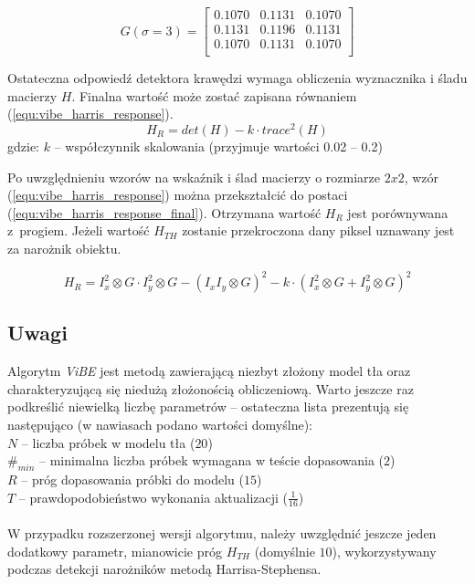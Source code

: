     \begin{equation}
       G(\sigma=3) = \begin{bmatrix}
			   0.1070 & 0.1131 & 0.1070 \\
			   0.1131 & 0.1196 & 0.1131 \\
			   0.1070 & 0.1131 & 0.1070 \\
		    \end{bmatrix}
        \label{equ:vibe_gauss}
    \end{equation}


Ostateczna odpowiedź detektora krawędzi wymaga obliczenia wyznacznika i śladu macierzy $H$. 
Finalna wartość może zostać zapisana równaniem (\ref{equ:vibe_harris_response}).
    \begin{equation}
        H_R = det(H)-k \cdot trace^2(H)
        \label{equ:vibe_harris_response}
    \end{equation}
gdzie: $k$ -- współczynnik skalowania (przyjmuje wartości \num{0.02} -- \num{0.2})


Po uwzględnieniu wzorów na wskaźnik i ślad macierzy o rozmiarze $2x2$, wzór (\ref{equ:vibe_harris_response}) można przekształcić do postaci (\ref{equ:vibe_harris_response_final}). 
Otrzymana wartość $H_R$ jest porównywana z~progiem. 
Jeżeli wartość $H_{TH}$ zostanie przekroczona dany piksel uznawany jest za narożnik obiektu.  

    \begin{equation}
        H_R = I_x^2 \otimes G \cdot I_y^2 \otimes G - (I_x I_y \otimes G)^2  - k \cdot (I_x^2 \otimes G + I_y^2 \otimes G)^2
        \label{equ:vibe_harris_response_final}
    \end{equation}

\subsection{Uwagi}
\label{subsec:vibe_uwagi}

Algorytm \textit{ViBE} jest metodą zawierającą niezbyt złożony model tła oraz charakteryzującą się niedużą złożonością obliczeniową. 
Warto jeszcze raz podkreślić niewielką liczbę parametrów -- ostateczna lista prezentują się następująco (w nawiasach podano wartości domyślne):\\
\-\hspace{1cm} $N$ -- liczba próbek w modelu tła ($20$)\\
\-\hspace{1cm} $\#_{min}$ -- minimalna liczba próbek wymagana w teście dopasowania ($2$)\\
\-\hspace{1cm} $R$ -- próg dopasowania próbki do modelu ($15$) \\
\-\hspace{1cm} $T$ -- prawdopodobieństwo wykonania aktualizacji ($\frac{1}{16}$)\\
\\
\noindent W przypadku rozszerzonej wersji algorytmu, należy uwzględnić jeszcze jeden dodatkowy parametr, mianowicie próg $H_{TH}$ (domyślnie $10$), wykorzystywany podczas detekcji narożników metodą Harrisa-Stephensa.
    

